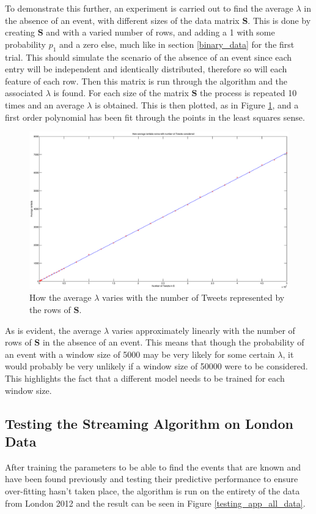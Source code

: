 \documentclass[11pt,a4paper]{article}
\newcommand{\smat}{\mathbf{S}}
\begin{document}
To demonstrate this further, an experiment is carried out to find the average $\lambda$ in the absence of an event, with different sizes of the data matrix $\smat$. This is done by creating $\smat$ and with a varied number of rows, and adding a 1 with some probability $p_1$ and a zero else, much like in section \ref{binary_data} for the first trial. This should simulate the scenario of the absence of an event since each entry will be independent and identically distributed, therefore so will each feature of each row. Then this matrix is run through the algorithm and the associated $\lambda$ is found. For each size of the matrix $\smat$ the process is repeated 10 times and an average $\lambda$ is obtained. This is then plotted, as in Figure \ref{lambda_vs_tweets}, and a first order polynomial has been fit through the points in the least squares sense. 
\begin{figure}[H]
\centering
\includegraphics[scale=0.35]{lambda_vs_number_tweets.eps}
\caption{How the average $\lambda$ varies with the number of Tweets represented by the rows of $\mathbf{S}$.}
\label{lambda_vs_tweets}
\end{figure}

As is evident, the average $\lambda$ varies approximately linearly with the number of rows of $\smat$ in the absence of an event. This means that though the probability of an event with a window size of 5000 may be very likely for some certain $\lambda$, it would probably be very unlikely if a window size of 50000 were to be considered. This highlights the fact that a different model needs to be trained for each window size.

\subsection{Testing the Streaming Algorithm on London Data} 
\label{london_test}
After training the parameters to be able to find the events that are known and have been found previously and testing their predictive performance to ensure over-fitting hasn't taken place, the algorithm is run on the entirety of the data from London 2012 and the result can be seen in Figure \ref{testing_app_all_data}. 
\end{document}

